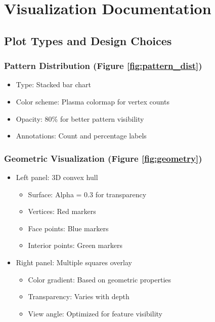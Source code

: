 \documentclass[11pt]{article}
\begin{document}
\section{Visualization Documentation}
\label{sec:visualization}

\subsection{Plot Types and Design Choices}

\subsubsection{Pattern Distribution (Figure \ref{fig:pattern_dist})}
\begin{itemize}
    \item Type: Stacked bar chart
    \item Color scheme: Plasma colormap for vertex counts
    \item Opacity: 80\% for better pattern visibility
    \item Annotations: Count and percentage labels
\end{itemize}

\subsubsection{Geometric Visualization (Figure \ref{fig:geometry})}
\begin{itemize}
    \item Left panel: 3D convex hull
    \begin{itemize}
        \item Surface: Alpha = 0.3 for transparency
        \item Vertices: Red markers
        \item Face points: Blue markers
        \item Interior points: Green markers
    \end{itemize}
    \item Right panel: Multiple squares overlay
    \begin{itemize}
        \item Color gradient: Based on geometric properties
        \item Transparency: Varies with depth
        \item View angle: Optimized for feature visibility
    \end{itemize}
\end{itemize}
\end{document}
